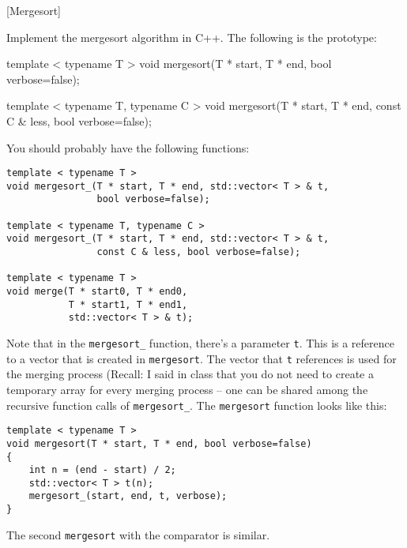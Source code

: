 [Mergesort]

Implement the mergesort algorithm in C++.
The following is the prototype:

\begin{console}[frame=single, fontsize=\footnotesize]
template < typename T >
void mergesort(T * start, T * end, bool verbose=false);

template < typename T, typename C >
void mergesort(T * start, T * end, const C & less, bool verbose=false);
\end{console}

You should probably have the following functions:
\begin{Verbatim}[frame=single, commandchars=\~\!\@, fontsize=\footnotesize]
template < typename T >
void mergesort_(T * start, T * end, std::vector< T > & t,
                bool verbose=false);

template < typename T, typename C >
void mergesort_(T * start, T * end, std::vector< T > & t,
                const C & less, bool verbose=false);

template < typename T >
void merge(T * start0, T * end0,
           T * start1, T * end1,
           std::vector< T > & t);
\end{Verbatim}
Note that in the \verb!mergesort_! function, there's a parameter
\verb!t!.
This is a reference to a vector that is created in
\verb!mergesort!.
The vector that \verb!t! references is used for the merging process
(Recall: I said in class that you do not need to create a temporary
array for every merging process -- one can be shared among the
recursive function calls of \verb!mergesort_!.
The \verb!mergesort! function looks like this:
\begin{Verbatim}[frame=single,commandchars=\~\!\@, fontsize=\footnotesize]
template < typename T >
void mergesort(T * start, T * end, bool verbose=false)
{
    int n = (end - start) / 2;
    std::vector< T > t(n);
    mergesort_(start, end, t, verbose);
}
\end{Verbatim}
The second \verb!mergesort! with the comparator is similar.

